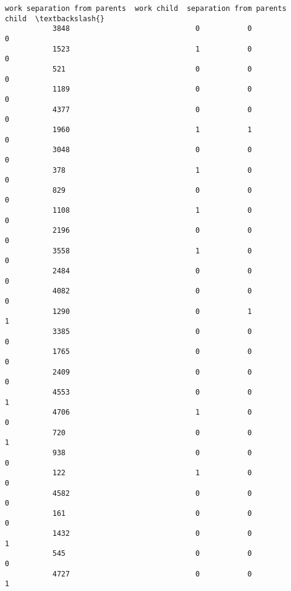 \documentclass[11pt]{article}
\begin{document}
\begin{Verbatim}[commandchars=\\\{\}]
                 work separation from parents  work child  separation from parents child  \textbackslash{}
           3848                             0           0                              0   
           1523                             1           0                              0   
           521                              0           0                              0   
           1189                             0           0                              0   
           4377                             0           0                              0   
           1960                             1           1                              0   
           3048                             0           0                              0   
           378                              1           0                              0   
           829                              0           0                              0   
           1108                             1           0                              0   
           2196                             0           0                              0   
           3558                             1           0                              0   
           2484                             0           0                              0   
           4082                             0           0                              0   
           1290                             0           1                              1   
           3385                             0           0                              0   
           1765                             0           0                              0   
           2409                             0           0                              0   
           4553                             0           0                              1   
           4706                             1           0                              0   
           720                              0           0                              1   
           938                              0           0                              0   
           122                              1           0                              0   
           4582                             0           0                              0   
           161                              0           0                              0   
           1432                             0           0                              1   
           545                              0           0                              0   
           4727                             0           0                              1   

\end{Verbatim}
\end{document}
